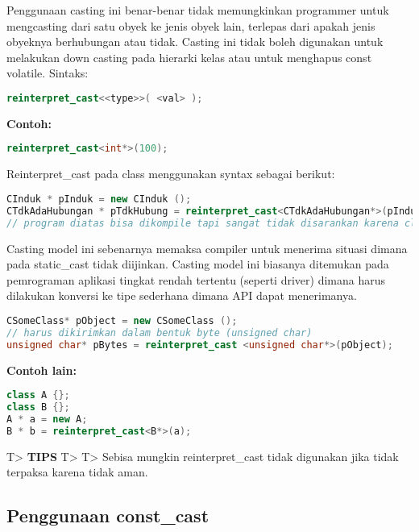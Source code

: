 Penggunaan casting ini benar-benar tidak memungkinkan programmer untuk
mengcasting dari satu obyek ke jenis obyek lain, terlepas dari apakah
jenis obyeknya berhubungan atau tidak. Casting ini tidak boleh digunakan
untuk melakukan down casting pada hierarki kelas atau untuk menghapus
const volatile. Sintaks:

\begin{lstlisting}[language=c++, numbers=none]
reinterpret_cast<<type>>( <val> );
\end{lstlisting}

\textbf{Contoh:}

\begin{lstlisting}[language=c++, numbers=none]
reinterpret_cast<int*>(100);
\end{lstlisting}

Reinterpret\_cast pada class menggunakan syntax sebagai berikut:

\begin{lstlisting}[language=c++, numbers=none]
CInduk * pInduk = new CInduk ();
CTdkAdaHubungan * pTdkHubung = reinterpret_cast<CTdkAdaHubungan*>(pInduk);
// program diatas bisa dikompile tapi sangat tidak disarankan karena class CtdkAdaHubungan bukanlah turunan dari Cinduk.
\end{lstlisting}

Casting model ini sebenarnya memaksa compiler untuk menerima situasi
dimana pada static\_cast tidak diijinkan. Casting model ini biasanya
ditemukan pada pemrograman aplikasi tingkat rendah tertentu (seperti
driver) dimana harus dilakukan konversi ke tipe sederhana dimana API
dapat menerimanya.

\begin{lstlisting}[language=c++, numbers=none]
CSomeClass* pObject = new CSomeClass ();
// harus dikirimkan dalam bentuk byte (unsigned char)
unsigned char* pBytes = reinterpret_cast <unsigned char*>(pObject);
\end{lstlisting}

\textbf{Contoh lain:}

\begin{lstlisting}[language=c++, numbers=none]
class A {};
class B {};
A * a = new A;
B * b = reinterpret_cast<B*>(a);
\end{lstlisting}

T\textgreater{} \textbf{TIPS} T\textgreater{} T\textgreater{} Sebisa
mungkin reinterpret\_cast tidak digunakan jika tidak terpaksa karena
tidak aman.

\subsection{Penggunaan const\_cast}\label{penggunaan-constux5fcast}

